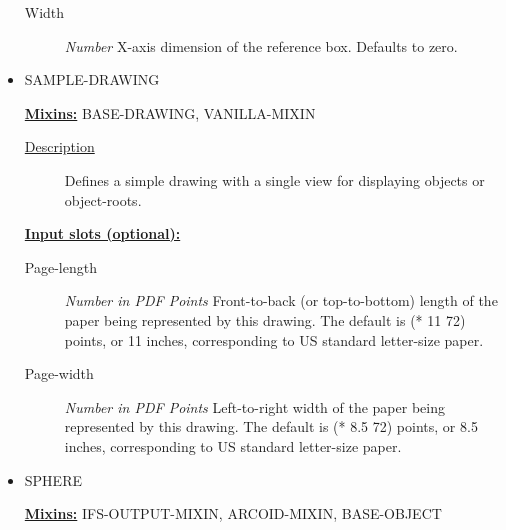 \documentclass [11pt]{book}
\begin{document}
\begin{itemize}
\begin{description}
\item [Width]
\emph{Number} X-axis dimension of the reference box. Defaults to zero.


\end{description}







\item {}SAMPLE-DRAWING


\textbf{
\underline{Mixins:}} BASE-DRAWING, VANILLA-MIXIN





\begin{description}

\item [
\underline{Description}]


Defines a simple drawing with a single view for displaying objects or object-roots.



\end{description}








\textbf{
\underline{Input slots (optional):}}

\begin{description}

\item [Page-length]
\emph{Number in PDF Points} Front-to-back (or top-to-bottom) length of the paper being represented
by this drawing. The default is (* 11 72) points, or 11 inches, corresponding to US standard
letter-size paper.


\item [Page-width]
\emph{Number in PDF Points} Left-to-right width of the paper being represented by this drawing.
The default is (* 8.5 72) points, or 8.5 inches, corresponding to US standard letter-size paper.


\end{description}







\item {}SPHERE


\textbf{
\underline{Mixins:}} IFS-OUTPUT-MIXIN, ARCOID-MIXIN, BASE-OBJECT






\end{itemize}
\end{document}
